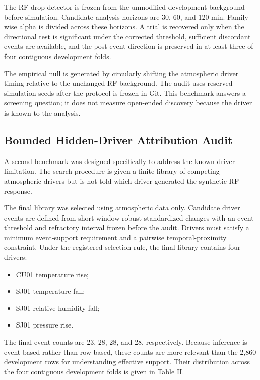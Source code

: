 \documentclass{ieeeaccess}
\providecommand{\tightlist}{\setlength{\itemsep}{0pt}\setlength{\parskip}{0pt}}
\begin{document}
The RF-drop detector is frozen from the unmodified development background before simulation. Candidate analysis horizons are 30, 60, and 120 min. Family-wise alpha is divided across these horizons. A trial is recovered only when the directional test is significant under the corrected threshold, sufficient discordant events are available, and the post-event direction is preserved in at least three of four contiguous development folds.

The empirical null is generated by circularly shifting the atmospheric driver timing relative to the unchanged RF background. The audit uses reserved simulation seeds after the protocol is frozen in Git. This benchmark answers a screening question; it does not measure open-ended discovery because the driver is known to the analysis.

\subsection{Bounded Hidden-Driver Attribution Audit}\label{bounded-hidden-driver-attribution-audit}

A second benchmark was designed specifically to address the known-driver limitation. The search procedure is given a finite library of competing atmospheric drivers but is not told which driver generated the synthetic RF response.

The final library was selected using atmospheric data only. Candidate driver events are defined from short-window robust standardized changes with an event threshold and refractory interval frozen before the audit. Drivers must satisfy a minimum event-support requirement and a pairwise temporal-proximity constraint. Under the registered selection rule, the final library contains four drivers:

\begin{itemize}
\tightlist
\item
  CU01 temperature rise;
\item
  SJ01 temperature fall;
\item
  SJ01 relative-humidity fall;
\item
  SJ01 pressure rise.
\end{itemize}

The final event counts are 23, 28, 28, and 28, respectively. Because inference is event-based rather than row-based, these counts are more relevant than the 2,860 development rows for understanding effective support. Their distribution across the four contiguous development folds is given in Table II.
\end{document}
